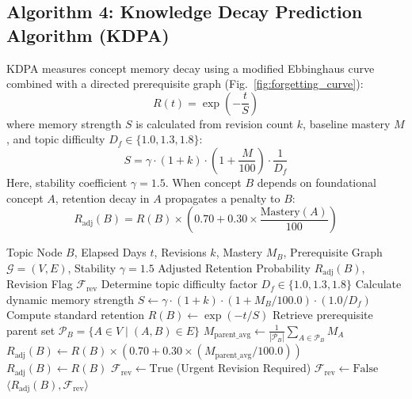 \documentclass[conference]{IEEEtran}
\begin{document}
\subsection{Algorithm 4: Knowledge Decay Prediction Algorithm (KDPA)}
KDPA measures concept memory decay using a modified Ebbinghaus curve combined with a directed prerequisite graph (Fig.~\ref{fig:forgetting_curve}):
\begin{equation}
R(t) = \exp\left( -\frac{t}{S} \right)
\label{eq:ebbinghaus}
\end{equation}
where memory strength $S$ is calculated from revision count $k$, baseline mastery $M$, and topic difficulty $D_f \in \{1.0, 1.3, 1.8\}$:
\begin{equation}
S = \gamma \cdot (1 + k) \cdot \left( 1 + \frac{M}{100} \right) \cdot \frac{1}{D_f}
\end{equation}
Here, stability coefficient $\gamma = 1.5$. When concept $B$ depends on foundational concept $A$, retention decay in $A$ propagates a penalty to $B$:
\begin{equation}
R_{\text{adj}}(B) = R(B) \times \left( 0.70 + 0.30 \times \frac{\text{Mastery}(A)}{100} \right)
\label{eq:prereq}
\end{equation}

\begin{algorithm}[htbp]
\caption{Knowledge Decay Prediction Algorithm (KDPA)}
\label{alg:kdpa}
\begin{algorithmic}[1]
\REQUIRE Topic Node $B$, Elapsed Days $t$, Revisions $k$, Mastery $M_B$, Prerequisite Graph $\mathcal{G} = (V, E)$, Stability $\gamma = 1.5$
\ENSURE Adjusted Retention Probability $R_{\text{adj}}(B)$, Revision Flag $\mathcal{F}_{\text{rev}}$
\STATE Determine topic difficulty factor $D_f \in \{1.0, 1.3, 1.8\}$
\STATE Calculate dynamic memory strength $S \leftarrow \gamma \cdot (1 + k) \cdot (1 + M_B / 100.0) \cdot (1.0 / D_f)$
\STATE Compute standard retention $R(B) \leftarrow \exp(-t / S)$
\STATE Retrieve prerequisite parent set $\mathcal{P}_B = \{ A \in V \mid (A, B) \in E \}$
    \STATE $M_{\text{parent\_avg}} \leftarrow \frac{1}{|\mathcal{P}_B|} \sum_{A \in \mathcal{P}_B} M_A$
    \STATE $R_{\text{adj}}(B) \leftarrow R(B) \times (0.70 + 0.30 \times (M_{\text{parent\_avg}} / 100.0))$
\ELSE
    \STATE $R_{\text{adj}}(B) \leftarrow R(B)$
\ENDIF
{}
    \STATE $\mathcal{F}_{\text{rev}} \leftarrow \text{True}$ (Urgent Revision Required)
\ELSE
    \STATE $\mathcal{F}_{\text{rev}} \leftarrow \text{False}$
\ENDIF
\RETURN $\langle R_{\text{adj}}(B), \mathcal{F}_{\text{rev}} \rangle$
\end{algorithmic}
\end{algorithm}
\end{document}

